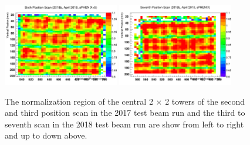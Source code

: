 \documentclass[hidelinks,11pt]{article}
\numberwithin{figure}{section}
\numberwithin{table}{section}
\begin{document}
\begin{figure}[hbtp]
\begin{center}
\includegraphics[width=0.45\textwidth]{Plots/2018/6th/Normalized.png}
\includegraphics[width=0.45\textwidth]{Plots/2018/7th/Normalized.png}
\caption{The normalization region of the central 2 $\times$ 2 towers of the second and third position scan in the 2017 test beam run and the third to seventh scan in the 2018 test beam run are show from left to right and up to down above.}
\label{fig:TowerNormj}
\end{center}
\end{figure} 
\end{document}
